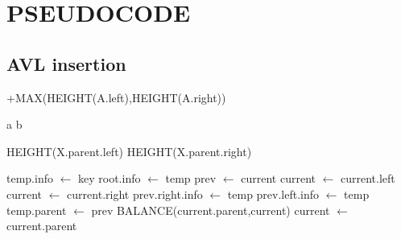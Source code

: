 \documentclass{article}
\begin{document}
\section{PSEUDOCODE}
\subsection{AVL insertion}
\begin{algorithm}
\caption{HEIGHT(A)}
\begin{algorithmic}
{
	\ENDIF
	+MAX(HEIGHT(A.left),HEIGHT(A.right))
}
\end{algorithmic}
\end{algorithm}
\begin{algorithm}
\caption{MAX(a,b)}
\begin{algorithmic}
{
		\RETURN a
	\ELSE
		\RETURN b
	\ENDIF
}
\end{algorithmic}
\end{algorithm}
\begin{algorithm}
\caption{SIBLINGHEIGHT(X)}
\begin{algorithmic}
{
	{
		{
			\ELSE
				\RETURN HEIGHT(X.parent.left)
			\ENDIF
		}
		\ENDIF
		{
			\ELSE
				\RETURN HEIGHT(X.parent.right)
			\ENDIF
		}
		\ENDIF
	}
	\ENDIF
}
\end{algorithmic}
\end{algorithm}
\newpage
\begin{algorithm}
\caption{AVL(key)}
\begin{algorithmic}
{
	\STATE temp.info {$\leftarrow$} key
		\STATE root.info {$\leftarrow$} temp
	\ENDIF
	{
		\STATE prev {$\leftarrow$} current
			\STATE current {$\leftarrow$} current.left
		\ELSE
			\STATE current {$\leftarrow$} current.right
		\ENDIF
	}
	\ENDWHILE 
		\STATE prev.right.info {$\leftarrow$} temp
	\ELSE
		\STATE prev.left.info {$\leftarrow$} temp
	\ENDIF
	\STATE temp.parent {$\leftarrow$} prev
	{
			\STATE BALANCE(current.parent,current)
		\ENDIF
		\STATE current {$\leftarrow$} current.parent
	}
	\ENDWHILE
}
\end{algorithmic}
\end{algorithm}
\end{document}
